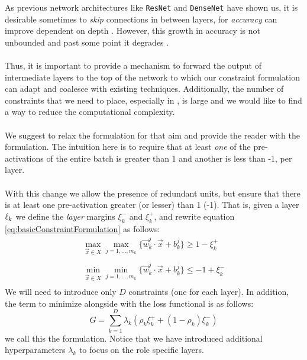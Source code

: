 As previous network architectures like \texttt{ResNet} and \texttt{DenseNet} have shown us, it is desirable sometimes to \emph{skip} connections in between layers, for \emph{accuracy} can improve dependent on depth \cite{resnet, densenet}. However, this growth in accuracy is not unbounded and past some point it degrades \cite{simpnet}. 
\\\\
Thus, it is important to provide a mechanism to forward the output of intermediate layers to the top of the network to which our constraint formulation can adapt and coalesce with existing techniques. Additionally, the number of constraints that we need to place, especially in \SepUnitPoint, is large and we would like to find a way to reduce the computational complexity.
\\\\
We suggest to relax the \SepUnit formulation for that aim and provide the reader with the \SepLayer formulation. The intuition here is to require that at least \emph{one} of the pre-activations of the entire batch is greater than 1 and another is less than -1, per layer.  
\\\\
With this change we allow the presence of redundant units, but ensure that there is at least one pre-activation greater (or lesser) than 1 (-1). That is, given a layer $\ell_k$ we define the \emph{layer} margins $\xi^{-}_k$ and $\xi^{+}_k$, and rewrite equation \ref{eq:basicConstraintFormulation} as follows:
\begin{equation}\label{eq:layerSeparationConstraint}
\begin{array}{lcl}
    \displaystyle\max_{\vec{x}\in{X}}\max_{j=1,\ldots,m_k}\{\vec{w}^j_k\cdot\vec{x}+b^j_k\}\geq 1-\xi^{+}_k\\\\
    \displaystyle\min_{\vec{x}\in{X}}\min_{j=1,\ldots,m_k}\{\vec{w}^j_k\cdot\vec{x}+b^j_k\}\leq -1+\xi^{-}_k\\
\end{array}    
\end{equation}
We will need to introduce only $D$ constraints (one for each layer). In addition, the term to minimize alongside with the loss functional is as follows:
\begin{equation}\label{eq:constraintLossForLayerSeparation}
    G = \sum_{k=1}^{D}\lambda_k(\rho_{k}\xi^{+}_{k}+(1-\rho_{k})\xi^{-}_{k})
\end{equation}
we call this the \SepLayer formulation. Notice that we have introduced additional hyperparameters $\lambda_k$ to focus on the role specific layers.   


